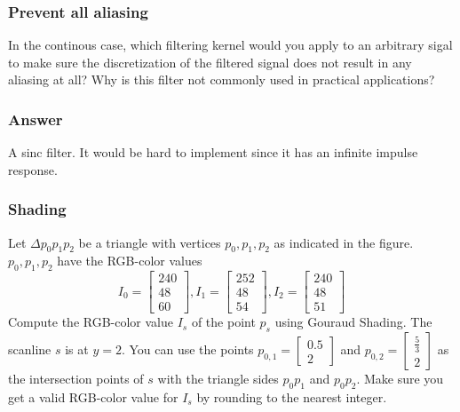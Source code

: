 \documentclass[a4paper,10pt]{article}
\begin{document}
\subsubsection{Prevent all aliasing}
In the continous case, which filtering kernel would you apply to an arbitrary sigal to make sure the discretization of the filtered signal does not result in any aliasing at all? Why is this filter not commonly used in practical applications?

\subsubsection{Answer}
A sinc filter. It would be hard to implement since it has an infinite impulse response.

\subsubsection{Shading}
Let \( \Delta p_{0}p_{1}p_{2} \) be a triangle with vertices \( p_{0},p_{1},p_{2} \) as indicated in the figure. \( p_{0},p_{1},p_{2} \) have the RGB-color values
\[
    I_0 = \left[\begin{smallmatrix}240 \\ 48 \\ 60\end{smallmatrix}\right], I_{1} = \left[\begin{smallmatrix}252 \\ 48 \\ 54\end{smallmatrix}\right], I_{2} = \left[\begin{smallmatrix}240 \\ 48 \\ 51\end{smallmatrix}\right]
\] 
Compute the RGB-color value \( I_s \) of the point \( p_s \) using Gouraud Shading. The scanline \( s \) is at \( y = 2 \). You can use the points \( p_{0,1} = \left[\begin{smallmatrix}0.5 \\ 2 \end{smallmatrix}\right] \) and \( p_{0,2} = \left[\begin{smallmatrix} \frac{5}{3} \\ 2 \end{smallmatrix}\right] \) as the intersection points of \( s \) with the triangle sides \( p_0 p_1 \) and \( p_0 p_2 \). Make sure you get a valid RGB-color value for \( I_s \) by rounding to the nearest integer.
\end{document}
